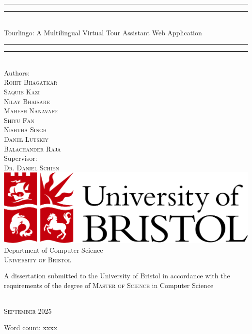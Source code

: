 \begin{titlepage}

\vspace*{13mm}

\begin{center}
\rule[0.5ex]{\linewidth}{2pt}\vspace*{-\baselineskip}\vspace*{3.2pt}
\rule[0.5ex]{\linewidth}{1pt}\\[\baselineskip]
{\LARGE Tourlingo: A Multilingual Virtual Tour Assistant Web Application}\\[4mm]
\rule[0.5ex]{\linewidth}{1pt}\vspace*{-\baselineskip}\vspace{3.2pt}
\rule[0.5ex]{\linewidth}{2pt}\\

\vspace{6.5mm}
{\large Authors: \\
\textsc{Rohit Bhagatkar} \\
\textsc{Saquib Kazi} \\
\textsc{Nilay Bhaisare} \\
\textsc{Mahesh Nanavare} \\
\textsc{Shiyu Fan} \\
\textsc{Nishtha Singh} \\
\textsc{Daniil Lutskiy} \\
\textsc{Balachander Raja}}\\

\vspace{6.5mm}
{\large Supervisor: \\
\textsc{Dr. Daniel Schien}}\\

\vspace{11mm}
\includegraphics[scale=0.2]{images/logos/bristollogo_colour}\\
\vspace{6mm}
{\large Department of Computer Science\\
\vspace{6mm}
\textsc{University of Bristol}}\\
\vspace{6mm}
\begin{minipage}{10cm}
A dissertation submitted to the University of Bristol in accordance with the requirements of the degree of \textsc{Master of Science} in Computer Science
\end{minipage}\\
\vspace{11mm}
{\large\textsc{September 2025}}
\vspace{11mm}
\end{center}

\begin{flushright}
{\small Word count: xxxx}
\end{flushright}

\end{titlepage}
